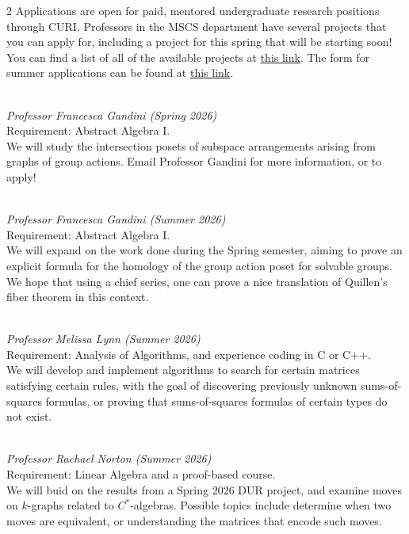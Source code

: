 \documentclass[12pt]{article}
\begin{document}
\begin{multicols}{2}
Applications are open for paid, mentored undergraduate research positions through CURI. Professors in the MSCS department have several projects that you can apply for, including a project for this spring that will be starting soon! You can find a list of all of the available projects at \href{https://digital.stolaf.edu/curi/search/s/5e8c06cc-27c0-4228-87e8-7132ffc5b1cf?resultsView=grid}{this link}. The form for summer applications can be found at \href{https://docs.google.com/forms/d/1K9YCnceEL_edJ96lQTq_fi_BYXJItPi83mRmbuJlspo/viewform?edit_requested=true}{this link}. \vspace{0.25cm}

 \\ \textit{Professor Francesca Gandini (Spring 2026)} \\ Requirement: Abstract Algebra I. \\ We will study the intersection posets of subspace arrangements arising from graphs of group actions. Email Professor Gandini for more information, or to apply! \vspace{0.25cm}

 \\ \textit{Professor Francesca Gandini (Summer 2026)} \\ Requirement: Abstract Algebra I. \\ We will expand on the work done during the Spring semester, aiming to prove an explicit formula for the homology of the group action poset for solvable groups. We hope that using a chief series, one can prove a nice translation of Quillen’s fiber theorem in this context. \vspace{0.25cm}

 \\ \textit{Professor Melissa Lynn (Summer 2026)} \\ Requirement: Analysis of Algorithms, and experience coding in C or C++.\\ We will develop and implement algorithms to search for certain matrices satisfying certain rules, with the goal of discovering previously unknown sums-of-squares formulas, or proving that sums-of-squares formulas of certain types do not exist. \vspace{0.25cm}

 \\ \textit{Professor Rachael Norton (Summer 2026)} \\ Requirement: Linear Algebra and a proof-based course. \\ We will buid on the results from a Spring 2026 DUR project, and examine moves on $k$-graphs related to $C^{*}$-algebras. Possible topics include determine when two moves are equivalent, or understanding the matrices that encode such moves. \vspace{0.25cm}


\end{multicols}
\end{document}
